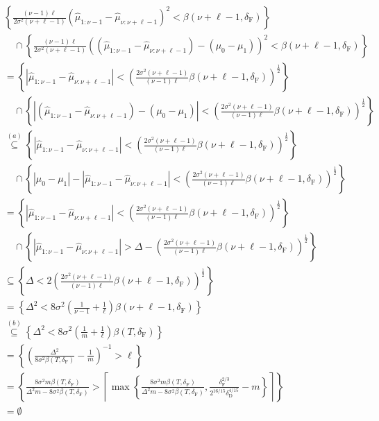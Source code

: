 \documentclass[12pt]{interact}
\newcommand{\lp}{\left(}
\newcommand{\rp}{\right)}
\newcommand{\lbp}{\left\{}
\newcommand{\rbp}{\right\}}
\newcommand{\lba}{\left\lvert}
\newcommand{\rba}{\right\rvert}
\newcommand{\mrm}{\mathrm}
\newcommand{\lce}{\left\lceil}
\newcommand{\rce}{\right\rceil}
\theoremstyle{plain}
\begin{document}
\begin{align}\nonumber
    &\lbp\frac{\lp\nu-1\rp \ell}{2\sigma^{2}\lp\nu+\ell-1\rp}\lp\hat{\mu}_{1:\nu-1}-\hat{\mu}_{\nu:\nu+\ell-1}\rp^{2}<\beta\lp\nu+\ell-1,\delta_{\mrm{F}}\rp\rbp\\\nonumber
    &\quad\cap\lbp\frac{\lp\nu-1\rp \ell}{2\sigma^{2}\lp\nu+\ell-1\rp}\lp\lp\hat{\mu}_{1:\nu-1}-\hat{\mu}_{\nu:\nu+\ell-1}\rp-\lp\mu_{0}-\mu_{1}\rp\rp^{2}<\beta\lp\nu+\ell-1,\delta_{\mrm{F}}\rp\rbp\\\nonumber
    &=\lbp\lba\hat{\mu}_{1:\nu-1}-\hat{\mu}_{\nu:\nu+\ell-1}\rba<\lp\frac{2\sigma^{2}\lp\nu+\ell-1\rp}{\lp\nu-1\rp \ell}\beta\lp\nu+\ell-1,\delta_{\mrm{F}}\rp\rp^{\frac{1}{2}}\rbp\\\nonumber
    &\quad\cap\lbp\lba\lp\hat{\mu}_{1:\nu-1}-\hat{\mu}_{\nu:\nu+\ell-1}\rp-\lp\mu_{0}-\mu_{1}\rp\rba<\lp\frac{2\sigma^{2}\lp\nu+\ell-1\rp}{\lp\nu-1\rp \ell}\beta\lp\nu+\ell-1,\delta_{\mrm{F}}\rp\rp^{\frac{1}{2}}\rbp\\\nonumber
    &\overset{(a)}{\subseteq}\lbp\lba\hat{\mu}_{1:\nu-1}-\hat{\mu}_{\nu:\nu+\ell-1}\rba<\lp\frac{2\sigma^{2}\lp\nu+\ell-1\rp}{\lp\nu-1\rp \ell}\beta\lp\nu+\ell-1,\delta_{\mrm{F}}\rp\rp^{\frac{1}{2}}\rbp\\\nonumber
    &\quad\cap\lbp\lba\mu_{0}-\mu_{1}\rba-\lba\hat{\mu}_{1:\nu-1}-\hat{\mu}_{\nu:\nu+\ell-1}\rba<\lp\frac{2\sigma^{2}\lp\nu+\ell-1\rp}{\lp\nu-1\rp \ell}\beta\lp\nu+\ell-1,\delta_{\mrm{F}}\rp\rp^{\frac{1}{2}}\rbp\\\nonumber
    &=\lbp\lba\hat{\mu}_{1:\nu-1}-\hat{\mu}_{\nu:\nu+\ell-1}\rba<\lp\frac{2\sigma^{2}\lp\nu+\ell-1\rp}{\lp\nu-1\rp \ell}\beta\lp\nu+\ell-1,\delta_{\mrm{F}}\rp\rp^{\frac{1}{2}}\rbp\\\nonumber
    &\quad\cap\lbp\lba\hat{\mu}_{1:\nu-1}-\hat{\mu}_{\nu:\nu+\ell-1}\rba>\Delta-\lp\frac{2\sigma^{2}\lp\nu+\ell-1\rp}{\lp\nu-1\rp \ell}\beta\lp\nu+\ell-1,\delta_{\mrm{F}}\rp\rp^{\frac{1}{2}}\rbp\\\nonumber
    &\subseteq\lbp\Delta<2\lp\frac{2\sigma^{2}\lp\nu+\ell-1\rp}{\lp\nu-1\rp \ell}\beta\lp\nu+\ell-1,\delta_{\mrm{F}}\rp\rp^{\frac{1}{2}}\rbp\\\nonumber
    &=\lbp\Delta^{2}<8\sigma^{2}\lp\frac{1}{\nu-1}+\frac{1}{\ell}\rp\beta\lp\nu+\ell-1,\delta_{\mrm{F}}\rp\rbp\\\nonumber
    &\overset{(b)}{\subseteq}\lbp\Delta^{2}<8\sigma^{2}\lp\frac{1}{m}+\frac{1}{\ell}\rp\beta\lp T,\delta_{\mrm{F}}\rp\rbp\\\nonumber
    &=\lbp\lp\frac{\Delta^{2}}{8\sigma^{2}\beta\lp T,\delta_{\mrm{F}}\rp}-\frac{1}{m}\rp^{-1}>\ell\rbp\\\nonumber
    &=\lbp \frac{8\sigma^{2}m\beta\lp T,\delta_{\mrm{F}}\rp}{\Delta^{2}m-8\sigma^{2}\beta\lp T,\delta_{\mrm{F}}\rp}>\lce\max\lbp\frac{8\sigma^{2}m\beta\lp T,\delta_{\mrm{F}}\rp}{\Delta^{2}m-8\sigma^{2}\beta\lp T,\delta_{\mrm{F}}\rp},\frac{\delta_{\mrm{F}}^{2/3}}{2^{16/15}\delta_{\mrm{D}}^{4/15}}-m\rbp\rce\rbp\\
    &=\emptyset\label{eq:implication_delay}
\end{align}
\end{document}

